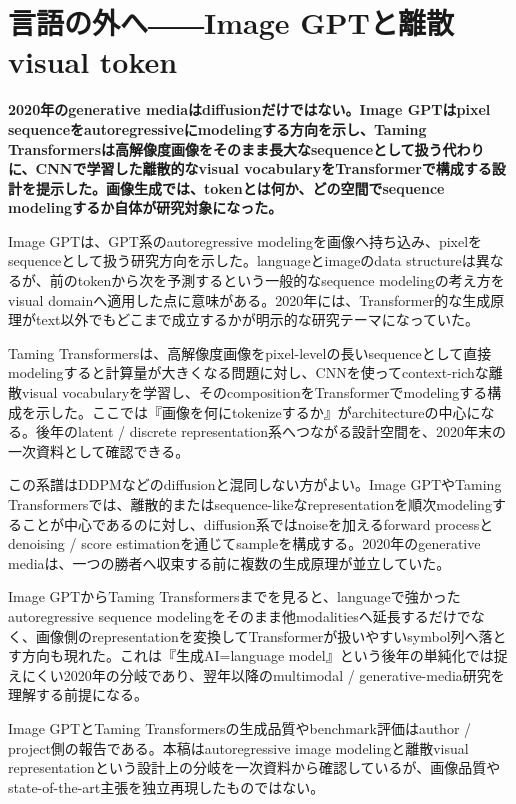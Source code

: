 \section{言語の外へ――Image GPTと離散visual token}
\label{pkg:media-autoregressive}
\noindent\textbf{2020年のgenerative mediaはdiffusionだけではない。Image GPTはpixel sequenceをautoregressiveにmodelingする方向を示し、Taming Transformersは高解像度画像をそのまま長大なsequenceとして扱う代わりに、CNNで学習した離散的なvisual vocabularyをTransformerで構成する設計を提示した。画像生成では、tokenとは何か、どの空間でsequence modelingするか自体が研究対象になった。}\autocite{src-03b656c5d291,src-d46ff01d5c8d}

Image GPTは、GPT系のautoregressive modelingを画像へ持ち込み、pixelをsequenceとして扱う研究方向を示した。languageとimageのdata structureは異なるが、前のtokenから次を予測するという一般的なsequence modelingの考え方をvisual domainへ適用した点に意味がある。2020年には、Transformer的な生成原理がtext以外でもどこまで成立するかが明示的な研究テーマになっていた。\autocite{src-d46ff01d5c8d}


Taming Transformersは、高解像度画像をpixel-levelの長いsequenceとして直接modelingすると計算量が大きくなる問題に対し、CNNを使ってcontext-richな離散visual vocabularyを学習し、そのcompositionをTransformerでmodelingする構成を示した。ここでは『画像を何にtokenizeするか』がarchitectureの中心になる。後年のlatent / discrete representation系へつながる設計空間を、2020年末の一次資料として確認できる。\autocite{src-03b656c5d291}


この系譜はDDPMなどのdiffusionと混同しない方がよい。Image GPTやTaming Transformersでは、離散的またはsequence-likeなrepresentationを順次modelingすることが中心であるのに対し、diffusion系ではnoiseを加えるforward processとdenoising / score estimationを通じてsampleを構成する。2020年のgenerative mediaは、一つの勝者へ収束する前に複数の生成原理が並立していた。\autocite{src-03b656c5d291,src-d46ff01d5c8d}


Image GPTからTaming Transformersまでを見ると、languageで強かったautoregressive sequence modelingをそのまま他modalitiesへ延長するだけでなく、画像側のrepresentationを変換してTransformerが扱いやすいsymbol列へ落とす方向も現れた。これは『生成AI=language model』という後年の単純化では捉えにくい2020年の分岐であり、翌年以降のmultimodal / generative-media研究を理解する前提になる。\autocite{src-03b656c5d291,src-d46ff01d5c8d}


\begin{claimboundary}
Image GPTとTaming Transformersの生成品質やbenchmark評価はauthor / project側の報告である。本稿はautoregressive image modelingと離散visual representationという設計上の分岐を一次資料から確認しているが、画像品質やstate-of-the-art主張を独立再現したものではない。\autocite{src-03b656c5d291,src-d46ff01d5c8d}
\end{claimboundary}
